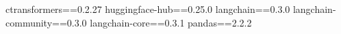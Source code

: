 ctransformers==0.2.27
huggingface-hub==0.25.0
langchain==0.3.0
langchain-community==0.3.0
langchain-core==0.3.1
pandas==2.2.2

